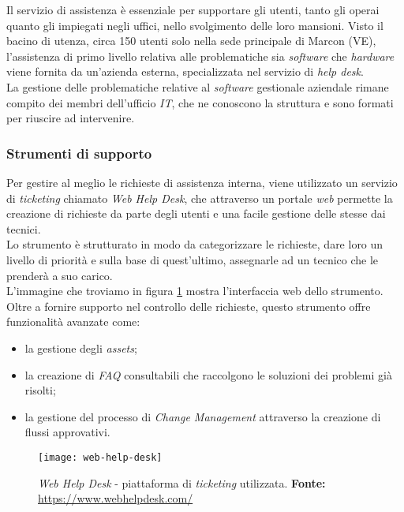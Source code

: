 Il servizio di assistenza è essenziale per supportare gli utenti, tanto gli operai quanto gli impiegati negli uffici, nello svolgimento delle loro mansioni. Visto il bacino di utenza, circa 150 utenti solo nella sede principale di Marcon (VE), l'assistenza di primo livello relativa alle problematiche sia \textit{software} che \textit{hardware} viene fornita da un'azienda esterna, specializzata nel servizio di \textit{help desk}.\\
La gestione delle problematiche relative al \textit{software} gestionale aziendale rimane compito dei membri dell'ufficio \textit{IT}, che ne conoscono la struttura e sono formati per riuscire ad intervenire. 


\subsubsection{Strumenti di supporto}

Per gestire al meglio le richieste di assistenza interna, viene utilizzato un servizio di \textit{ticketing} chiamato \textit{Web Help Desk}, che attraverso un portale \textit{web} permette la creazione di richieste da parte degli utenti e una facile gestione delle stesse dai tecnici. \\
Lo strumento è strutturato in modo da categorizzare le richieste, dare loro un livello di priorità e sulla base di quest'ultimo, assegnarle ad un tecnico che le prenderà a suo carico.\\ L'immagine che troviamo in figura \ref{fig:web-help-desk} mostra l'interfaccia web dello strumento.\\
Oltre a fornire supporto nel controllo delle richieste, questo strumento offre funzionalità avanzate come:
\begin{itemize}
	\item la gestione degli \textit{assets};
	\item la creazione di \textit{FAQ} consultabili che raccolgono le soluzioni dei problemi già risolti;
	\item la gestione del processo di \textit{Change Management} attraverso la creazione di flussi approvativi.
\end{itemize}

\vspace{10pt}
\begin{figure}[htbp]
	\begin{center}
		\texttt{[image: web-help-desk]}
		\caption{\textit{Web Help Desk} - piattaforma di \textit{ticketing} utilizzata.\newline
		\textbf{Fonte: }\url{https://www.webhelpdesk.com/}}
	\label{fig:web-help-desk}
	\end{center}
\end{figure}


